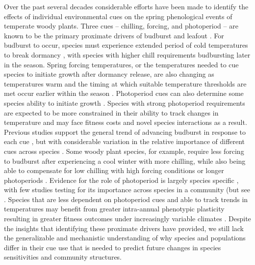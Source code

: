 \documentclass{article}\usepackage[]{graphicx}\usepackage[]{color}
\begin{document}
Over the past several decades considerable efforts have been made to identify the effects of individual environmental cues on the spring phenological events of temperate woody plants. Three cues -- chilling, forcing, and photoperiod -- are known to be the primary proximate drivers of budburst and leafout \citep{Chuine2016}. For budburst to occur, species must experience extended period of cold temperatures to break dormancy \citep{Cooke2012, Ritchie2003}, with species with higher chill requirements budbursting later in the season. %
Spring forcing temperatures, or the temperatures needed to cue species to initiate growth after dormancy release, are also changing as temperatures warm and the timing at which suitable temperature thresholds are met occur earlier within the season \citep{citation}. Photoperiod cues can also determine some species ability to initiate growth \citep{BaslerKoner2014, Zohner2020}. Species with strong photoperiod requirements are expected to be more constrained in their ability to track changes in temperature and may face fitness costs and novel species interactions as a result. Previous studies support the general trend of advancing budburst in response to each cue \citep{Flynn2018}, but with considerable variation in the relative importance of different cues across species \citep{Chuine2016?, Flynn2018, citations?}. Some woody plant species, for example, require less forcing to budburst after experiencing a cool winter with more chilling, while also being able to compensate for low chilling with high forcing conditions or longer photoperiods \citep{Laube2014, Harrington2015, Flynn2018,  Caffarra2011, Basler2014,  Zohner2016}. Evidence for the role of photoperiod is largely species specific  \citep{Heide1993, Basler2014, Singh2017, Zohner2016}, with few studies testing for its importance across species in a community (but see  \citep{Flynn2018}. Species that are less dependent on photoperiod cues and able to track trends in temperatures may benefit from greater intra-annual phenotypic plasticity resulting in greater fitness outcomes under increasingly variable climates \citep{citation}. Despite the insights that identifying these proximate drivers have provided, we still lack the generalizable and mechanistic understanding of why species and populations differ in their cue use that is needed to predict future changes in species sensitivities and community structures.
\end{document}
